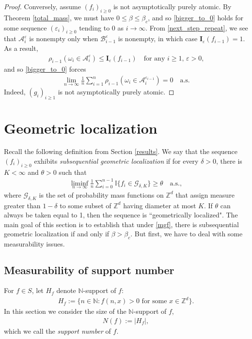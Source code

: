 \documentclass[11pt,reqno]{amsart}
\numberwithin{equation}{section}
\theoremstyle{definition}
\begin{document}
\begin{proof}
Conversely, assume $(f_i)_{i \geq 0}$ is not asymptotically purely atomic.
By Theorem \ref{total_mass}, we must have $0 \leq \beta \leq \beta_c$, and so \eqref{bigger_to_0} holds for some sequence $({\varepsilon}_i)_{i \geq 0}$ tending to 0 as $i \to \infty$.
From \eqref{next_step_repeat}, we see that ${\mathcal{A}}_i^{\varepsilon}$ is nonempty only when ${\mathcal{B}}_{i-1}^{\varepsilon}$ is nonempty, in which case ${{\boldsymbol {I}}}_{\varepsilon}(f_{i-1}) = 1$.
As a result,
{\begin{align*} {
\rho_{i-1}(\omega_i \in {\mathcal{A}}_i^{\varepsilon}) \leq {{\boldsymbol {I}}}_{\varepsilon}(f_{i-1}) \quad \text{for any $i \geq 1$, ${\varepsilon} > 0$,}
} \end{align*}}
and so \eqref{bigger_to_0} forces
{\begin{align*} {
\lim_{n \to \infty} \frac{1}{n} \sum_{i = 1}^{n} \rho_{i-1}(\omega_i \in {\mathcal{A}}_i^{{\varepsilon}_{i-1}}) = 0 \quad \mathrm{a.s.}
} \end{align*}}
Indeed, $(g_i)_{i \geq 1}$ is not asymptotically purely atomic.
\end{proof}

\section{Geometric localization} \label{main_thm2}
Recall the following definition from Section \ref{results}.
We say that the sequence $(f_i)_{i \geq 0}$ exhibits \textit{subsequential geometric localization} if for every $\delta > 0$, there is $K < \infty$ and $\theta  > 0$ such that
{\begin{align*} {
\liminf_{n \to \infty} \frac{1}{n} \sum_{i = 0}^{n-1} {\mathbb{I}}\{f_i \in {\mathcal{G}}_{\delta,K}\} \geq \theta \quad \mathrm{a.s.},
} \end{align*}}
where
${\mathcal{G}}_{\delta,K}$ is the set of probability mass functions on ${\mathbb{Z}}^d$ that assign measure greater than $1-\delta$ to some subset of ${\mathbb{Z}}^d$ having diameter at most $K$.
If $\theta$ can always be taken equal to 1, then the sequence is ``geometrically localized".
The main goal of this section is to establish that under \eqref{mgf}, there is subsequential geometric localization if and only if $\beta > \beta_c$.
But first, we have to deal with some measurability issues.

\subsection{Measurability of support number}
For $f \in S$, let $H_f$ denote ${\mathbb{N}}$-support of $f$:
{\begin{align*} {
H_f := \{n \in {\mathbb{N}} : f(n,x) > 0 \text{ for some $x \in {\mathbb{Z}}^d$}\}.
} \end{align*}}
In this section we consider the size of the ${\mathbb{N}}$-support of $f$,
{\begin{align*} {
N(f) := |H_f|,
} \end{align*}}
which we call the \textit{support number} of $f$.
\end{document}
